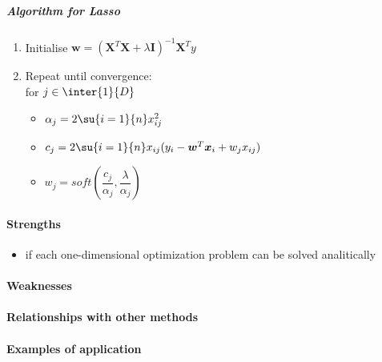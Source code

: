 \subparagraph{Algorithm for Lasso}
\begin{enumerate}
    \item Initialise $\bm{w} = \left(\bm{X}^{T}\bm{X} + \lambda\bm{I}\right)^{-1}\bm{X}^{T}y$
    \item Repeat until convergence:\\for $j\in\inter{1}{D}$
        \begin{itemize}
            \item $\alpha_{j} = 2\su{i=1}{n}x_{ij}^{2}$
            \item $c_{j} = 2\su{i=1}{n}x_{ij}(y_{i} - \bm{w}^{T}\bm{x}_{i} + w_{j}x_{ij})$
            \item $w_{j} = soft\left(\dfrac{c_{j}}{\alpha_{j}}, \dfrac{\lambda}{\alpha_{j}}\right)$
        \end{itemize}
\end{enumerate}


\paragraph{Strengths}
\begin{itemize}
    \item if each one-dimensional optimization problem can be solved analitically
\end{itemize}

\paragraph{Weaknesses}
\paragraph{Relationships with other methods}
\paragraph{Examples of application}

